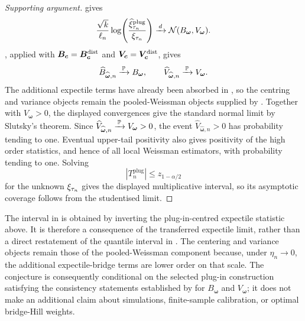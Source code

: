 \begin{proof}[Supporting argument]
 gives
\[
  \frac{\sqrt{k}}{\ell_n}
  \log\!\left(
    \frac{\widehat\xi_{\tau_n}^{\mathrm{plug}}}{\xi_{\tau_n}}
  \right)
  \xrightarrow{\,d\,}
  \mathcal N(B_{\bm\omega},V_{\bm\omega}).
\]
, applied with
\(\bm{B}_{\bm{c}}=\bm{B}_{\bm{c}}^{\mathrm{dist}}\) and \(\bm{V}_{\bm{c}}=\bm{V}_{\bm{c}}^{\mathrm{dist}}\), gives
\[
  \widehat B_{\widehat{\bm\omega},n}\xrightarrow{\,\operatorname{\mathbb{P}}\,} B_{\bm\omega},
  \qquad
  \widehat V_{\widehat{\bm\omega},n}\xrightarrow{\,\operatorname{\mathbb{P}}\,} V_{\bm\omega}.
\]
The additional expectile terms have already been absorbed in
, so the centring and variance objects remain
the pooled-Weissman objects supplied by
\textcite[\S2.2 and Corollary~1; Corollaries~6--7]{DaouiaPadoanStupfler2021}.
Together with
\(V_{\bm\omega}>0\), the displayed convergences give the standard normal limit
by Slutsky's theorem.
Since \(\widehat V_{\widehat{\bm\omega},n}\xrightarrow{\,\operatorname{\mathbb{P}}\,} V_{\bm\omega}>0\), the event
\(\widehat V_{\widehat{\bm\omega},n}>0\) has probability tending to one.
Eventual upper-tail positivity also gives positivity of the high order
statistics, and hence of all local Weissman estimators, with probability
tending to one.
Solving
\[
  \left|T_n^{\mathrm{plug}}\right|\le z_{1-\alpha/2}
\]
for the unknown \(\xi_{\tau_n}\) gives the displayed multiplicative
interval, so its asymptotic coverage follows from the studentised limit.
\end{proof}

\begin{remark}
\label{rem:pool-ext:interval-scope}
The interval in  is obtained by inverting
the plug-in-centred expectile statistic above. It is therefore a consequence
of the transferred expectile limit, rather than a direct restatement of the
quantile interval in \textcite{DaouiaPadoanStupfler2021}. The centering and
variance objects remain those of the pooled-Weissman component because, under
\(\eta_n\to0\), the additional expectile-bridge terms are lower order on that
scale. The conjecture is consequently conditional on the selected plug-in
construction satisfying the consistency statements established by
\textcite[\S2.2 and Corollary~1; Corollaries~6--7]{DaouiaPadoanStupfler2021}
for \(B_{\bm\omega}\) and \(V_{\bm\omega}\); it does not make an additional
claim about simulations, finite-sample calibration, or optimal bridge-Hill
weights.
\end{remark}
